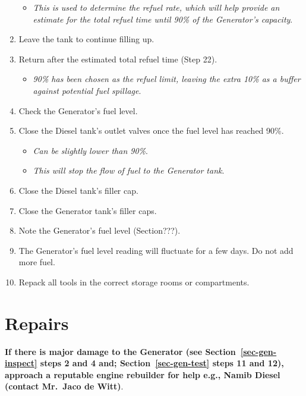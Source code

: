 \documentclass[
  12pt,
]{report}
\providecommand{\tightlist}{%
  \setlength{\itemsep}{0pt}\setlength{\parskip}{0pt}}\usepackage{longtable,booktabs,array}
\begin{document}
\begin{enumerate}
  \begin{itemize}
  \tightlist
  \item
    \emph{This is used to determine the refuel rate, which will help
    provide an estimate for the total refuel time until 90\% of the
    Generator's capacity}.
  \end{itemize}
\item
  Leave the tank to continue filling up.
\item
  Return after the estimated total refuel time (Step 22).

  \begin{itemize}
  \tightlist
  \item
    \emph{90\% has been chosen as the refuel limit, leaving the extra
    10\% as a buffer against potential fuel spillage}.
  \end{itemize}
\item
  Check the Generator's fuel level.
\item
  Close the Diesel tank's outlet valves once the fuel level has reached
  90\%.

  \begin{itemize}
  \tightlist
  \item
    \emph{Can be slightly lower than 90\%}.
  \item
    \emph{This will stop the flow of fuel to the Generator tank}.
  \end{itemize}
\item
  Close the Diesel tank's filler cap.
\item
  Close the Generator tank's filler caps.
\item
  Note the Generator's fuel level (Section???).
\item
  The Generator's fuel level reading will fluctuate for a few days. Do
  not add more fuel.
\item
  Repack all tools in the correct storage rooms or compartments.
\end{enumerate}

\hypertarget{repairs-3}{%
\section{Repairs}\label{repairs-3}}

\textbf{If there is major damage to the Generator (see
Section~\ref{sec-gen-inspect} steps 2 and 4 and;
Section~\ref{sec-gen-test} steps 11 and 12), approach a reputable engine
rebuilder for help e.g., Namib Diesel (contact Mr.~Jaco de Witt)}.
\end{document}
